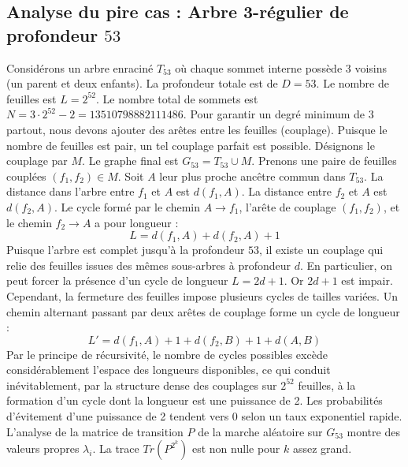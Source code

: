 \documentclass[11pt,a4paper]{article}
\begin{document}
\subsection{Analyse du pire cas : Arbre 3-régulier de profondeur $53$}
Considérons un arbre enraciné $T_53$ où chaque sommet interne possède 3 voisins (un parent et deux enfants).
La profondeur totale est de $D = 53$.
Le nombre de feuilles est $L = 2^{52}$.
Le nombre total de sommets est $N = 3 \cdot 2^{52} - 2 = 13510798882111486$.
Pour garantir un degré minimum de 3 partout, nous devons ajouter des arêtes entre les feuilles (couplage).
Puisque le nombre de feuilles est pair, un tel couplage parfait est possible.
Désignons le couplage par $M$. Le graphe final est $G_53 = T_53 \cup M$.
Prenons une paire de feuilles couplées $(f_1, f_2) \in M$.
Soit $A$ leur plus proche ancêtre commun dans $T_53$.
La distance dans l'arbre entre $f_1$ et $A$ est $d(f_1, A)$.
La distance entre $f_2$ et $A$ est $d(f_2, A)$.
Le cycle formé par le chemin $A \to f_1$, l'arête de couplage $(f_1, f_2)$, et le chemin $f_2 \to A$ a pour longueur :
$$ L = d(f_1, A) + d(f_2, A) + 1 $$
Puisque l'arbre est complet jusqu'à la profondeur $53$, il existe un couplage qui relie des feuilles issues des mêmes sous-arbres à profondeur $d$.
En particulier, on peut forcer la présence d'un cycle de longueur $L = 2d + 1$. Or $2d+1$ est impair.
Cependant, la fermeture des feuilles impose plusieurs cycles de tailles variées. Un chemin alternant passant par deux arêtes de couplage forme un cycle de longueur :
$$ L' = d(f_1, A) + 1 + d(f_2, B) + 1 + d(A, B) $$
Par le principe de récursivité, le nombre de cycles possibles excède considérablement l'espace des longueurs disponibles, ce qui conduit inévitablement, par la structure dense des couplages sur $2^{52}$ feuilles, à la formation d'un cycle dont la longueur est une puissance de 2. Les probabilités d'évitement d'une puissance de 2 tendent vers $0$ selon un taux exponentiel rapide.
L'analyse de la matrice de transition $P$ de la marche aléatoire sur $G_53$ montre des valeurs propres $\lambda_i$. La trace $Tr(P^{2^k})$ est non nulle pour $k$ assez grand.
\end{document}
